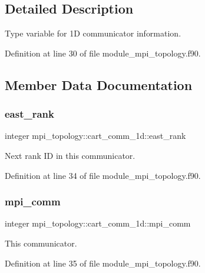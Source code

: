 \subsection{Detailed Description}
Type variable for 1D communicator information. 

Definition at line 30 of file module\+\_\+mpi\+\_\+topology.\+f90.



\subsection{Member Data Documentation}
\mbox{\label{structmpi__topology_1_1cart__comm__1d_a550b10f02ed0c5a8469174df8b54f525}} 
\subsubsection{\texorpdfstring{east\_rank}{east\_rank}}
{\footnotesize\ttfamily integer mpi\+\_\+topology\+::cart\+\_\+comm\+\_\+1d\+::east\+\_\+rank}



Next rank ID in this communicator. 



Definition at line 34 of file module\+\_\+mpi\+\_\+topology.\+f90.

\mbox{\label{structmpi__topology_1_1cart__comm__1d_ab9d9b0c2f72db4fb74c0264691778a45}} 
\subsubsection{\texorpdfstring{mpi\_comm}{mpi\_comm}}
{\footnotesize\ttfamily integer mpi\+\_\+topology\+::cart\+\_\+comm\+\_\+1d\+::mpi\+\_\+comm}



This communicator. 



Definition at line 35 of file module\+\_\+mpi\+\_\+topology.\+f90.

\mbox{\label{structmpi__topology_1_1cart__comm__1d_a0b76696fcf5c27f5cfdc48e53a2671ef}} 
